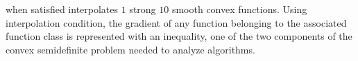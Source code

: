 when satisfied interpolates $1$ strong $10$ smooth convex functions. Using interpolation condition, the gradient of any function belonging to the associated function class is represented with an inequality, one of the two components of the convex semidefinite problem needed to analyze algorithms.
